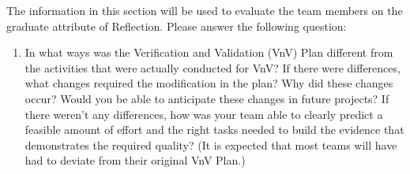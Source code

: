 \documentclass[12pt, titlepage]{article}
\begin{document}
The information in this section will be used to evaluate the team members on the
graduate attribute of Reflection.  Please answer the following question:

\begin{enumerate}
  \item In what ways was the Verification and Validation (VnV) Plan different
  from the activities that were actually conducted for VnV?  If there were
  differences, what changes required the modification in the plan?  Why did
  these changes occur?  Would you be able to anticipate these changes in future
  projects?  If there weren't any differences, how was your team able to clearly
  predict a feasible amount of effort and the right tasks needed to build the
  evidence that demonstrates the required quality?  (It is expected that most
  teams will have had to deviate from their original VnV Plan.)
\end{enumerate}
\end{document}
